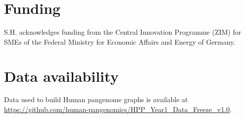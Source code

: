\documentclass{bioinfo}
\begin{document}


\section*{Funding}

S.H. acknowledges funding from the Central Innovation Programme (ZIM) for SMEs of the Federal Ministry for Economic Affairs and Energy of Germany.

\section*{Data availability}

Data used to build Human pangenome graphs is available at \url{https://github.com/human-pangenomics/HPP_Year1_Data_Freeze_v1.0}.


%
%
%
%
%
%
%











\end{document}
